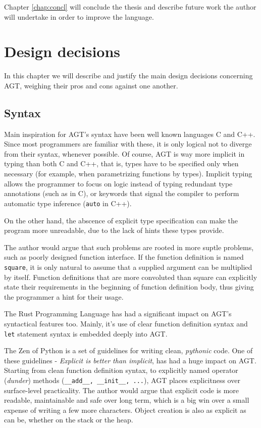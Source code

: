 \documentclass[times, utf8, diplomski]{fer}
\theoremstyle{definition}
\begin{document}
Chapter \ref{chap:concl} will conclude the thesis and describe future work the
author will undertake in order to improve the language.

\chapter{Design decisions}\label{chap:design}

In this chapter we will describe and justify the main design decisions concerning AGT,
weighing their pros and cons against one another.

\section{Syntax}

Main inspiration for AGT's syntax have been well known languages C and C++.
Since most programmers are familiar with these, it is only logical not to diverge from their syntax,
whenever possible.
Of course, AGT is way more implicit in typing than both C and C++, that is, types have to be specified
only when necessary (for example, when parametrizing functions by types).
Implicit typing allows the programmer to focus on logic instead of typing redundant type annotations
(such as in C), or keywords that signal the compiler to perform automatic type
inference (\texttt{auto} in C++).

On the other hand, the abscence of explicit type specification can make the program more unreadable,
due to the lack of hints these types provide. 

The author would argue that such problems are
rooted in more suptle problems, such as poorly designed function interface.
If the function definition is named \texttt{square}, 
it is only natural to assume that a supplied argument can be multiplied by itself.
Function definitions that are more convoluted than square can explicitly state their requirements
in the beginning of function definition body, thus giving the programmer a hint for their usage. 

The Rust Programming Language has had a significant impact on AGT's syntactical features too.
Mainly, it's use of clear function definition syntax and \texttt{let} statement syntax is
embedded deeply into AGT.

The Zen of Python \citep{c_zen} is a set of guidelines for writing clean, \textit{pythonic} code. 
One of these guidelines - \textit{Explicit is better than implicit}, has had a huge impact on AGT.
Starting from clean function definition syntax, to explicitly named operator (\textit{dunder}) methods
(\texttt{\_\_add\_\_, \_\_init\_\_, ...}), AGT places explicitness over surface-level practicality.
The author would argue that explicit code is more readable, maintainable and safe over long term,
which is a big win over a small expense of writing a few more characters.
Object creation is also as explicit as can be, whether on the stack or the heap.
\end{document}
